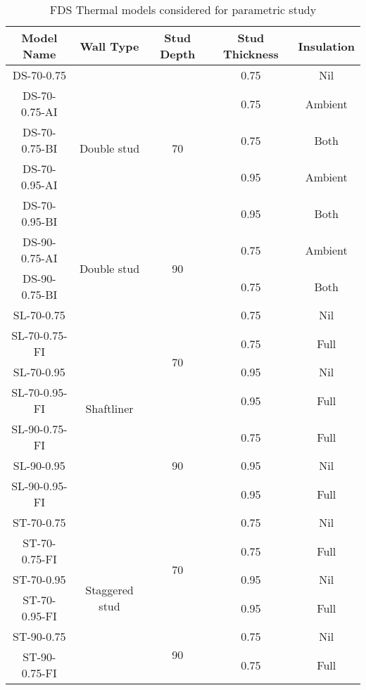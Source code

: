 \begin{table}[htbp]
	\centering
	\caption{FDS Thermal models considered for parametric study}
	  \begin{tabular}{ccccc}
	  \toprule
	  \textbf{Model Name} & \textbf{Wall Type} & \textbf{Stud Depth} & \textbf{Stud Thickness} & \textbf{Insulation} \\
	  \midrule
	  DS-70-0.75 & \multirow{5}[2]{*}{Double stud} & \multirow{5}[2]{*}{70} & 0.75  & Nil \\
	  DS-70-0.75-AI &       &       & 0.75  & Ambient \\
	  DS-70-0.75-BI &       &       & 0.75  & Both \\
	  DS-70-0.95-AI &       &       & 0.95  & Ambient \\
	  DS-70-0.95-BI &       &       & 0.95  & Both \\
	  \midrule
	  DS-90-0.75-AI & \multirow{2}[2]{*}{Double stud} & \multirow{2}[2]{*}{90} & 0.75  & Ambient \\
	  DS-90-0.75-BI &       &       & 0.75  & Both \\
	  \midrule
	  SL-70-0.75 & \multirow{7}[4]{*}{Shaftliner} & \multirow{4}[2]{*}{70} & 0.75  & Nil \\
	  SL-70-0.75-FI &       &       & 0.75  & Full \\
	  SL-70-0.95 &       &       & 0.95  & Nil \\
	  SL-70-0.95-FI &       &       & 0.95  & Full \\
  \cmidrule{1-1}\cmidrule{3-5}    SL-90-0.75-FI &       & \multirow{3}[2]{*}{90} & 0.75  & Full \\
	  SL-90-0.95 &       &       & 0.95  & Nil \\
	  SL-90-0.95-FI &       &       & 0.95  & Full \\
	  \midrule
	  ST-70-0.75 & \multirow{6}[4]{*}{Staggered stud} & \multirow{4}[2]{*}{70} & 0.75  & Nil \\
	  ST-70-0.75-FI &       &       & 0.75  & Full \\
	  ST-70-0.95 &       &       & 0.95  & Nil \\
	  ST-70-0.95-FI &       &       & 0.95  & Full \\
  \cmidrule{1-1}\cmidrule{3-5}    ST-90-0.75 &       & \multirow{2}[2]{*}{90} & 0.75  & Nil \\
	  ST-90-0.75-FI &       &       & 0.75  & Full \\
	  \bottomrule
	  \end{tabular}%
	\label{tab:fds-parametric-models}%
  \end{table}%
  
